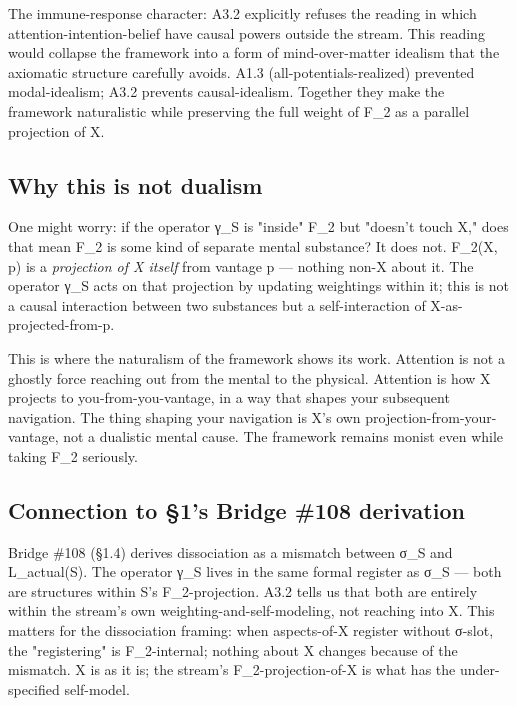 \documentclass[11pt, openany]{book}
\begin{document}
The immune-response character: A3.2 explicitly refuses the reading in which attention-intention-belief have causal powers outside the stream. This reading would collapse the framework into a form of mind-over-matter idealism that the axiomatic structure carefully avoids. A1.3 (all-potentials-realized) prevented modal-idealism; A3.2 prevents causal-idealism. Together they make the framework naturalistic while preserving the full weight of F\_\allowbreak{}2 as a parallel projection of X.

\subsection{Why this is not dualism}

One might worry: if the operator γ\_\allowbreak{}S is "inside" F\_\allowbreak{}2 but "doesn't touch X," does that mean F\_\allowbreak{}2 is some kind of separate mental substance? It does not. F\_\allowbreak{}2(X, p) is a \textit{projection of X itself} from vantage p --- nothing non-X about it. The operator γ\_\allowbreak{}S acts on that projection by updating weightings within it; this is not a causal interaction between two substances but a self-interaction of X-as-projected-from-p.

This is where the naturalism of the framework shows its work. Attention is not a ghostly force reaching out from the mental to the physical. Attention is how X projects to you-from-you-vantage, in a way that shapes your subsequent navigation. The thing shaping your navigation is X's own projection-from-your-vantage, not a dualistic mental cause. The framework remains monist even while taking F\_\allowbreak{}2 seriously.

\subsection{Connection to §1's Bridge \#108 derivation}

Bridge \#108 (§1.4) derives dissociation as a mismatch between σ\_\allowbreak{}S and L\_\allowbreak{}actual(S). The operator γ\_\allowbreak{}S lives in the same formal register as σ\_\allowbreak{}S --- both are structures within S's F\_\allowbreak{}2-projection. A3.2 tells us that both are entirely within the stream's own weighting-and-self-modeling, not reaching into X. This matters for the dissociation framing: when aspects-of-X register without σ-slot, the "registering" is F\_\allowbreak{}2-internal; nothing about X changes because of the mismatch. X is as it is; the stream's F\_\allowbreak{}2-projection-of-X is what has the under-specified self-model.
\end{document}
